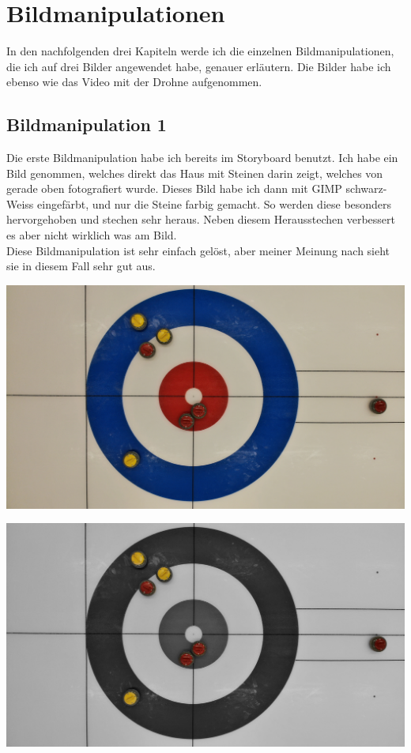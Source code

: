 \documentclass[11pt]{article}
\begin{document}
    \section{Bildmanipulationen}
    In den nachfolgenden drei Kapiteln werde ich die einzelnen Bildmanipulationen, die ich auf drei Bilder angewendet habe, genauer erläutern.
    Die Bilder habe ich ebenso wie das Video mit der Drohne aufgenommen.

    \subsection{Bildmanipulation 1}
    Die erste Bildmanipulation habe ich bereits im Storyboard benutzt. Ich habe ein Bild genommen, welches direkt das Haus mit Steinen darin
    zeigt, welches von gerade oben fotografiert wurde. Dieses Bild habe ich dann mit GIMP schwarz-Weiss eingefärbt, und nur die Steine farbig
    gemacht. So werden diese besonders hervorgehoben und stechen sehr heraus. Neben diesem Herausstechen verbessert es aber nicht wirklich was
    am Bild.\\
    Diese Bildmanipulation ist sehr einfach gelöst, aber meiner Meinung nach sieht sie in diesem Fall sehr gut aus.

    \noindent
    \begin{minipage}{0.5\textwidth}
        \includegraphics[width=\linewidth]{media/Black_White_Unedited}
    \end{minipage}
    \hfill
    \begin{minipage}[c]{0.5\textwidth}
        \includegraphics[width=\linewidth]{media/Black_White_Edited}
    \end{minipage}
\end{document}
